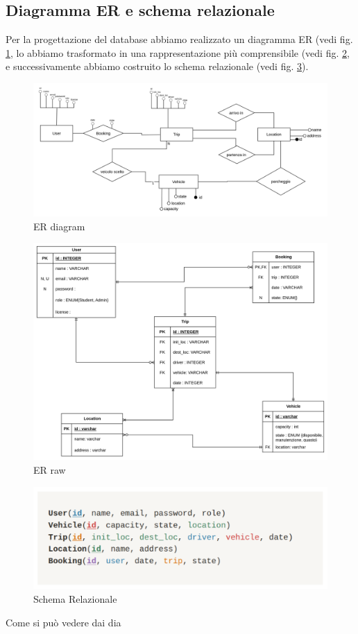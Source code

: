 \subsection{Diagramma ER e schema relazionale}
Per la progettazione del database abbiamo realizzato un diagramma ER (vedi fig. \ref{fig:ERdiag}, lo abbiamo trasformato in una rappresentazione più comprensibile (vedi fig. \ref{fig:ERraw}, e successivamente abbiamo costruito lo schema relazionale (vedi fig. \ref{fig:ERscheme}).
\begin{figure}
    \centering
    \includegraphics[width=1\linewidth]{Images/ER_diagram.png}
    \caption{ER diagram}
    \label{fig:ERdiag}
\end{figure}
\begin{figure}
    \centering
    \includegraphics[width=1\linewidth]{Images/ERraw.png}
    \caption{ER raw}
    \label{fig:ERraw}
\end{figure}

\begin{figure}
    \centering
    \includegraphics[width=1\linewidth]{Images/schema_relazionale.png}
    \caption{Schema Relazionale}
    \label{fig:ERscheme}
\end{figure}
Come si può  vedere dai dia